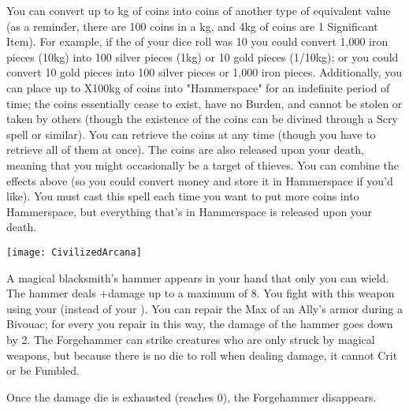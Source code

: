 \MYSTERY [
  Name = Exchequer,
  Link = arcana-mystery-exchequer,
  Paradigm = Entropy,
  Save = N,
  Duration = Instant,
  Target = Close Target(s)
]

You can convert up to \SUMDICE kg of coins into coins of another type of equivalent value (as a reminder, there are 100 coins in a kg, and 4kg of coins are 1 Significant Item). For example, if the \SUMDICE of your dice roll was 10 you could convert 1,000 iron pieces (10kg) into 100 silver pieces (1kg) or 10 gold pieces (1/10kg); or you could convert 10 gold pieces into 100 silver pieces or 1,000 iron pieces. Additionally, you can place up to \DICE X100kg of coins into "Hammerspace" for an indefinite period of time; the coins essentially cease to exist, have no Burden, and cannot be stolen or taken by others (though the existence of the coins can be divined through a Scry spell or similar).  You can retrieve the coins at any time (though you have to retrieve all of them at once).  The coins are also released upon your death, meaning that you might occasionally be a target of thieves.
You can combine the effects above (so you could convert money and store it in Hammerspace if you'd like).  You must cast this spell each time you want to put more coins into Hammerspace, but everything that's in Hammerspace is released upon your death.

  \begin{center}
  \texttt{[image: CivilizedArcana]}
  \end{center}



\MYSTERY [
  Name = Forgehammer,
  Link = arcana-mystery-forgehammer,
  Paradigm = Force,
  Save = N,
  Duration = Session,
  Target = Self
]

A magical blacksmith's hammer appears in your hand that only you can wield.  The hammer deals \DICE+\DICE damage up to a maximum of 8. You fight with this weapon using your \FOC (instead of your \VIG).  You can repair the Max \UD of an Ally's armor during a Bivouac; for every \DCUP you repair in this way, the damage of the hammer goes down by 2. The Forgehammer can strike creatures who are only struck by magical weapons, but because there is no die to roll when dealing damage, it cannot Crit or be Fumbled.

Once the damage die is exhausted (reaches 0), the Forgehammer disappears.


\MYSTERY [
  Name = Hone,
  Link = arcana-mystery-hone,
  Paradigm = Force,
  Save = N,
  Duration = Combat or \SUM Minutes,
  Target = Close Target(s)
]

